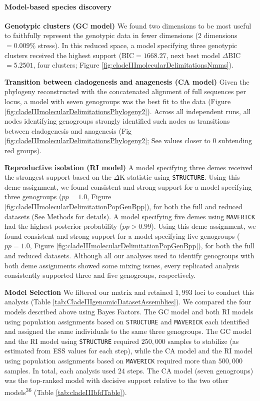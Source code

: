 \documentclass[
  11pt,
]{article}
\begin{document}
\hypertarget{model-based-species-discovery-5}{%
\paragraph{Model-based species discovery}\label{model-based-species-discovery-5}}

\textbf{Genotypic clusters (GC model)} We found two dimensions to be most useful to faithfully represent the genotypic data in fewer dimensions (2 dimensions \(=0.009\%\) stress). In this reduced space, a model specifying three genotypic clusters received the highest support (BIC\(=1668.27\), next best model \(\Delta\)BIC\(=5.2501\), four clusters; Figure \ref{fig:cladeIIImolecularDelimitationsNmms}).

\textbf{Transition between cladogenesis and anagenesis (CA model)} Given the phylogeny reconstructed with the concatenated alignment of full sequences per locus, a model with seven genogroups was the best fit to the data (Figure \ref{fig:cladeIIImolecularDelimitationsPhylogeny2}). Across all independent runs, all nodes identifying genogroups strongly identified such nodes as transitions between cladogenesis and anagenesis (Fig \ref{fig:cladeIIImolecularDelimitationsPhylogeny2}; See values closer to \(0\) subtending red groups).

\textbf{Reproductive isolation (RI model)} A model specifying three demes received the strongest support based on the \(\Delta\)K statistic using \texttt{STRUCTURE}. Using this deme assignment, we found consistent and strong support for a model specifying three genogroups (\(pp=1.0\), Figure \ref{fig:cladeIIImolecularDelimitationPopGenBpp}), for both the full and reduced datasets (See Methods for details). A model specifying five demes using \texttt{MAVERICK} had the highest posterior probability (\(pp>0.99\)). Using this deme assignment, we found consistent and strong support for a model specifying five genogroups (\(pp=1.0\), Figure \ref{fig:cladeIIImolecularDelimitationPopGenBpp}), for both the full and reduced datasets. Although all our analyses used to identify genogroups with both deme assignments showed some mixing issues, every replicated analysis consistently supported three and five genogroups, respectively.

\textbf{Model Selection} We filtered our matrix and retained \(1,993\) loci to conduct this analysis (Table \ref{tab:CladeIIIgenomicDatasetAssemblies}). We compared the four models described above using Bayes Factors. The GC model and both RI models using population assignments based on \texttt{STRUCTURE} and \texttt{MAVERICK} each identified and assigned the same individuals to the same three genogroups. The GC model and the RI model using \texttt{STRUCTURE} required \(250,000\) samples to stabilize (as estimated from ESS values for each step), while the CA model and the RI model using population assignments based on \texttt{MAVERICK} required more than \(500,000\) samples. In total, each analysis used \(24\) steps. The CA model (seven genogroups) was the top-ranked model with decisive support relative to the two other models\textsuperscript{36} (Table \ref{tab:cladeIIIbfdTable}).
\end{document}
